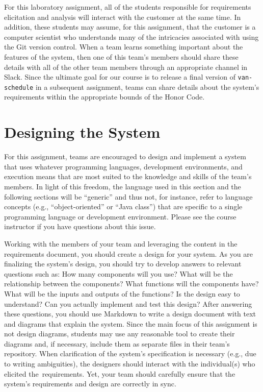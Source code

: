 For this laboratory assignment, all of the students responsible for requirements elicitation and analysis will interact
with the customer at the same time. In addition, these students may assume, for this assignment, that the customer is a
computer scientist who understands many of the intricacies associated with using the Git version control. When a team
learns something important about the features of the system, then one of this team's members should share these details
with all of the other team members through an appropriate channel in Slack. Since the ultimate goal for our course is to
release a final version of {\tt van-schedule} in a subsequent assignment, teams can share details about the system's
requirements within the appropriate bounds of the Honor Code.

\section*{Designing the System}

For this assignment, teams are encouraged to design and implement a system that uses whatever programming languages,
development environments, and execution means that are most suited to the knowledge and skills of the team's members.
In light of this freedom, the language used in this section and the following sections will be ``generic'' and thus not,
for instance, refer to language concepts (e.g., ``object-oriented'' or ``Java class'') that are specific to a single
programming language or development environment. Please see the course instructor if you have questions about this
issue.

Working with the members of your team and leveraging the content in the requirements document, you should create a
design for your system.  As you are finalizing the system's design, you should try to develop answers to relevant
questions such as: How many components will you use? What will be the relationship between the components? What
functions will the components have? What will be the inputs and outputs of the functions?  Is the design easy to
understand?  Can you actually implement and test this design? After answering these questions, you should use Markdown
to write a design document with text and diagrams that explain the system. Since the main focus of this assignment is
not design diagrams, students may use any reasonable tool to create their diagrams and, if necessary, include them as
separate files in their team's repository. When clarification of the system's specification is necessary (e.g., due to
writing ambiguities), the designers should interact with the individual(s) who elicited \mbox{the requirements}. Yet,
your team should carefully ensure that the system's requirements and design are correctly in sync.

